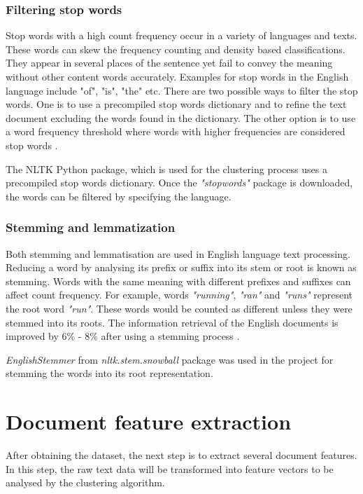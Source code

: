 \documentclass[conference]{IEEEtran}
\begin{document}
\subsubsection{Filtering stop words}

Stop words with a high count frequency occur in a variety of languages and texts. These words can skew the frequency counting and density based classifications. They appear in several places of the sentence yet fail to convey the meaning without other content words accurately. Examples for stop words in the English language include "of", "is", "the" etc. There are two possible ways to filter the stop words. One is to use a precompiled stop words dictionary and to refine the text document excluding the words found in the dictionary. The other option is to use a word frequency threshold where words with higher frequencies are considered stop words \cite{5635068}. 

The NLTK Python package, which is used for the clustering process uses a precompiled stop words dictionary. Once the \textit{"stopwords"} package is downloaded, the words can be filtered by specifying the language. 

\subsubsection{Stemming and lemmatization}

Both stemming and lemmatisation are used in English language text processing. Reducing a word by analysing its prefix or suffix into its stem or root is known as stemming. Words with the same meaning with different prefixes and suffixes can affect count frequency. For example, words \textit{"running"}, \textit{"ran"} and \textit{"runs"} represent the root word \textit{"run"}. These words would be counted as different unless they were stemmed into its roots. The information retrieval of the English documents is improved by 6\% - 8\% after using a stemming process \cite{6272740}. 

\textit{EnglishStemmer} from \textit{nltk.stem.snowball} package was used in the project for stemming the words into its root representation. 

\section{Document feature extraction}

After obtaining the dataset, the next step is to extract several document features. In this step, the raw text data will be transformed into feature vectors to be analysed by the clustering algorithm. 
\end{document}
